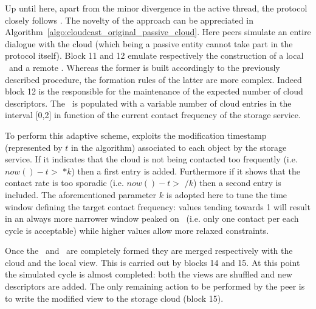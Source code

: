 Up until here, apart from the minor divergence in the active
thread, the protocol closely follows \cyclon. The novelty of the
approach can be appreciated in
Algorithm~\ref{algo:cloudcast_original_passive_cloud}.
Here peers simulate an entire dialogue with the cloud (which being
a passive entity cannot take part in the protocol
itself). Block 11 and 12 emulate respectively
the construction of a local \request\ and a remote \reply. Whereas
the former is built accordingly to the previously described procedure,
the formation rules of the latter are more complex. Indeed
block 12 is the responsible for the maintenance of the
expected number of cloud descriptors. The \reply\ is populated with
a variable number of cloud entries in the interval [0,2] in function
of the current contact frequency of the storage service.

To perform this adaptive scheme, \cloudcast exploits the modification
timestamp (represented by $t$ in the algorithm) associated to each
object by the storage service. If it indicates that the cloud is not
being contacted too frequently (i.e. $now() - t >$ \deltacyclon $* k$)
then a first entry is added. Furthermore if it shows that the contact
rate is too sporadic (i.e. $now() - t >$ \deltacyclon $/ k$) then a
second entry is included.
The aforementioned parameter $k$ is adopted here to tune the time
window defining the target contact frequency: values tending towards 1
will result in an always more narrower window peaked on \deltacyclon\
(i.e. only one contact per each \cyclon cycle is acceptable) while
higher values allow more relaxed constraints.

Once the \request\ and \reply\ are completely formed they are merged
respectively with the cloud and the local view. This is carried out by
blocks 14 and 15. At this point the
simulated cycle is almost completed: both the views are shuffled and new
descriptors are added. The only remaining action to be performed by
the peer is to write the modified view to the storage cloud
(block 15).

